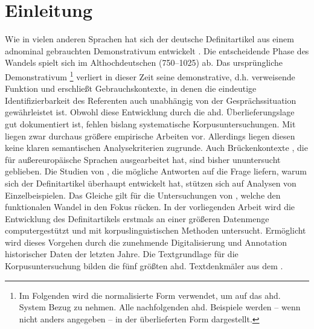 \chapter{Einleitung}

Wie in vielen anderen Sprachen hat sich der deutsche Definitartikel aus einem adnominal gebrauchten Demonstrativum entwickelt  \parencite{Oubouzar1992,Szczepaniak2011a}. Die entscheidende Phase des Wandels spielt sich im Althochdeutschen (750--1025) ab. Das ursprüngliche Demonstrativum \footnote{Im Folgenden wird die normalisierte Form  verwendet, um auf das ahd. System Bezug zu nehmen. Alle nachfolgenden ahd. Beispiele werden -- wenn nicht anders angegeben -- in der überlieferten Form dargestellt.} verliert in dieser Zeit seine demonstrative, d.h. verweisende Funktion und erschließt Gebrauchskontexte, in denen die eindeutige Identifizierbarkeit des Referenten auch unabhängig von der Gesprächssituation gewährleistet ist. Obwohl diese Entwicklung durch die ahd. Überlieferungslage gut dokumentiert ist, fehlen bislang systematische Korpusuntersuchungen. Mit \textcite{Hodler1954,Oubouzar1989,Oubouzar1992,Oubouzar1997a} liegen zwar durchaus größere empirische Arbeiten vor. Allerdings liegen diesen keine klaren semantischen Analysekriterien zugrunde. Auch Brückenkontexte \parencite{Heine2002a}, die \textcite{Himmelmann1997} für außereuropäische Sprachen ausgearbeitet hat, sind bisher ununtersucht geblieben. Die Studien von \textcite{Abraham1997,Philippi1997,Leiss2000}, die mögliche Antworten auf die Frage liefern, warum sich der Definitartikel überhaupt entwickelt hat, stützen sich auf Analysen von Einzelbeispielen. Das Gleiche gilt für die Untersuchungen von \textcite{Demske2001,Kraiss2012,Kraiss2014,Schlachter2015}, welche den funktionalen Wandel in den Fokus rücken.
In der vorliegenden Arbeit wird die Entwicklung des Definitartikels erstmals an einer größeren Datenmenge computergestützt und mit korpuslinguistischen Methoden untersucht. Ermöglicht wird dieses Vorgehen durch die zunehmende Digitalisierung und Annotation historischer Daten der letzten Jahre. Die Textgrundlage für die Korpusuntersuchung bilden die fünf größten ahd. Textdenkmäler aus dem   \parencite{Donhauser2015}.

